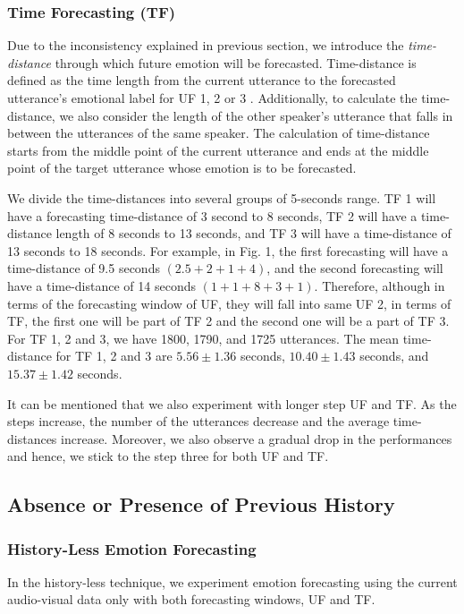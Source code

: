 \subsubsection{Time Forecasting (TF)}
\label{time_grps}
Due to the inconsistency explained in previous section, we introduce  the \textit{time-distance} through which future emotion will be forecasted. Time-distance is defined as the time length from the current utterance to the forecasted utterance's emotional label for UF 1, 2 or 3 . Additionally, to calculate the time-distance, we also consider the length of the other speaker's utterance that falls in between the utterances of the same speaker. The calculation of time-distance starts from the middle point of the current utterance and ends at the middle point of the target utterance whose emotion is to be forecasted.

We divide the time-distances into several groups of 5-seconds range. TF 1 will have a forecasting time-distance of 3 second to 8 seconds, TF 2 will have a  time-distance length of 8 seconds to 13 seconds, and TF 3 will have a time-distance of 13 seconds to 18 seconds.  For example, in Fig. 1, the first forecasting will have a time-distance of 9.5 seconds $(2.5+2+1+4)$, and the second forecasting will have a time-distance of 14 seconds $(1+1+8+3+1)$. Therefore, although in terms of the forecasting window of UF, they will fall into same UF 2, in terms of TF, the first one will be part of TF 2 and the second one will be a part of TF 3.  For TF 1, 2 and 3, we have 1800, 1790, and 1725 utterances. The mean time-distance for TF 1, 2 and 3 are $5.56\pm1.36$ seconds, $10.40\pm1.43$ seconds, and $15.37\pm1.42$ seconds. 

It can be mentioned that we also experiment with longer step UF and TF. As the steps increase, the number of the utterances decrease and the average time-distances increase. Moreover, we also observe a gradual drop in the performances and hence, we stick to the step three for both UF and TF. 


\subsection{Absence or Presence of Previous History}
\subsubsection{History-Less Emotion Forecasting}
In the history-less technique, we experiment emotion forecasting using the current audio-visual data only with both forecasting windows, UF and TF. 
